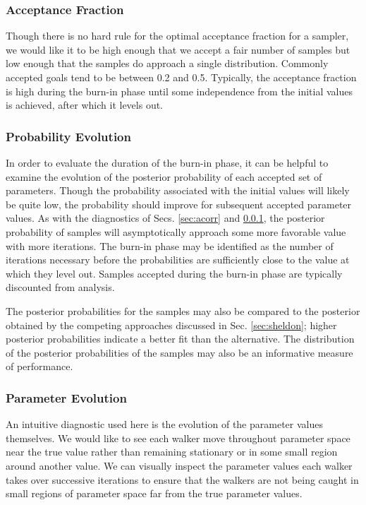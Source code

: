 \documentclass[preprint]{aastex}
\begin{document}
\clearpage
\subsubsection{Acceptance Fraction}
\label{sec:afrac}

Though there is no hard rule for the optimal acceptance fraction for a sampler, 
we would like it to be high enough that we accept a fair number of samples but 
low enough that the samples do approach a single distribution.  Commonly 
accepted goals tend to be between 0.2 and 0.5.  Typically, the acceptance 
fraction is high during the burn-in phase until some independence from the 
initial values is achieved, after which it levels out.

\clearpage
\subsubsection{Probability Evolution}
\label{sec:probs}

In order to evaluate the duration of the burn-in phase, it can be helpful to 
examine the evolution of the posterior probability of each accepted set of 
parameters.  Though the probability associated with the initial values will 
likely be quite low, the probability should improve for subsequent accepted 
parameter values.  As with the diagnostics of Secs. \ref{sec:acorr} and 
\ref{sec:afrac}, the posterior probability of samples will asymptotically 
approach some more favorable value with more iterations.  The burn-in phase may 
be identified as the number of iterations necessary before the probabilities 
are sufficiently close to the value at which they level out.  Samples accepted 
during the burn-in phase are typically discounted from analysis.  

The posterior probabilities for the samples may also be compared to the 
posterior obtained by the competing approaches discussed in Sec. 
\ref{sec:sheldon}; higher posterior probabilities indicate a better fit than 
the alternative.  The distribution of the posterior probabilities of the 
samples may also be an informative measure of performance.

\clearpage
\subsubsection{Parameter Evolution}
\label{sec:params}

An intuitive diagnostic used here is the evolution of the parameter values 
themselves.  We would like to see each walker move throughout parameter space 
near the true value rather than remaining stationary or in some small region 
around another value.  We can visually inspect the parameter values each walker 
takes over successive iterations to ensure that the walkers are not being 
caught in small regions of parameter space far from the true parameter values.  
\end{document}
